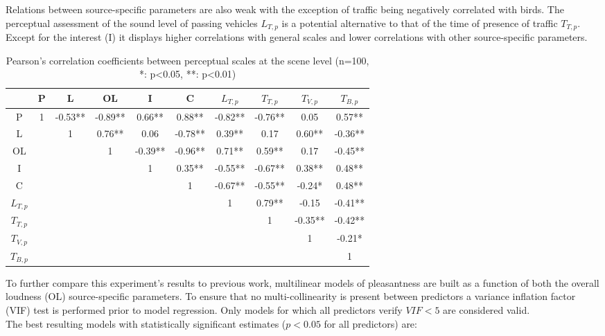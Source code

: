 \documentclass[11pt,a4paper]{article}
\begin{document}
Relations between source-specific parameters are also weak with the exception of traffic being negatively correlated with birds. The perceptual assessment of the sound level of passing vehicles $L_{T, p}$ is a potential alternative to that of the time of presence of traffic $T_{T, p}$. Except for the interest (I) it displays higher correlations with general scales and lower correlations with other source-specific parameters.\\

\begin{table}[t]
\centering
\caption{Pearson's correlation coefficients between perceptual scales at the scene level (n=100, *: p<0.05, **: p<0.01)}
\label{tab:percc}
\begin{tabular}{ c | c c c c c c c c c }
\hline
	 & P & L & OL & I & C & $L_{T, p}$ & $T_{T, p}$ & $T_{V, p}$ & $T_{B, p}$ \\ \hline
	P & 1 & -0.53** & -0.89** & 0.66** & 0.88** & -0.82** & -0.76** & 0.05 & 0.57** \\
	L &  & 1 & 0.76** & 0.06 & -0.78** & 0.39** & 0.17 & 0.60** & -0.36** \\
	OL &  &  & 1 & -0.39** & -0.96** & 0.71** & 0.59** & 0.17 & -0.45** \\
	I &  &  &  & 1 & 0.35** & -0.55** & -0.67** & 0.38** & 0.48** \\
	C &  &  &  &  & 1 & -0.67** & -0.55** & -0.24* & 0.48** \\
	$L_{T, p}$ &  &  &  &  &  & 1 & 0.79** & -0.15 & -0.41** \\
	$T_{T, p}$ &  &  &  &  &  &  & 1 & -0.35** & -0.42** \\
	$T_{V, p}$ &  &  &  &  &  &  &  & 1 & -0.21* \\
	$T_{B, p}$ &  &  &  &  &  &  &  &  & 1 \\ \hline
\end{tabular}
\end{table}


To further compare this experiment's results to previous work, multilinear models of pleasantness are built as a function of both the overall loudness (OL) source-specific parameters. To ensure that no multi-collinearity is present between predictors a variance inflation factor (VIF) test is performed prior to model regression. Only models for which all predictors verify $VIF<5$ are considered valid.\\

The best resulting models with statistically significant estimates ($p<0.05$ for all predictors) are:
\end{document}
